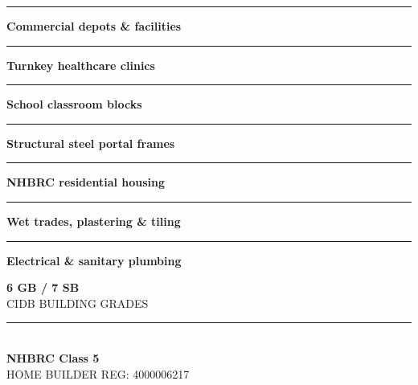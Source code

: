 \begin{minipage}[t]{0.34\textwidth}
    \vspace{0pt}
    \begin{tcolorbox}[
        enhanced, colback=mhoffwhite, colframe=mhnavy, boxrule=1pt, arc=4pt,
        title={\bfseries\color{white}\faBuilding\ Building Scope of Work},
        colbacktitle=mhnavy, left=7pt, right=7pt, top=6pt, bottom=6pt,
        drop shadow=black!6
    ]
        \fontsize{8.1pt}{11.6pt}\selectfont
        \textcolor{mhnavy}{\rule{4pt}{4pt}}\hspace{4pt}\textbf{Commercial depots \& facilities}\\
        \textcolor{mhnavy}{\rule{4pt}{4pt}}\hspace{4pt}\textbf{Turnkey healthcare clinics}\\
        \textcolor{mhnavy}{\rule{4pt}{4pt}}\hspace{4pt}\textbf{School classroom blocks}\\
        \textcolor{mhnavy}{\rule{4pt}{4pt}}\hspace{4pt}\textbf{Structural steel portal frames}\\
        \textcolor{mhnavy}{\rule{4pt}{4pt}}\hspace{4pt}\textbf{NHBRC residential housing}\\
        \textcolor{mhnavy}{\rule{4pt}{4pt}}\hspace{4pt}\textbf{Wet trades, plastering \& tiling}\\
        \textcolor{mhnavy}{\rule{4pt}{4pt}}\hspace{4pt}\textbf{Electrical \& sanitary plumbing}
    \end{tcolorbox}

    \vspace{0.20cm}

    \begin{tcolorbox}[
        enhanced, colback=white, colframe=mhlightgray, boxrule=0.8pt, arc=4pt,
        left=6pt, right=6pt, top=6pt, bottom=6pt, halign=center,
        drop shadow=black!4
    ]
        {\fontsize{18pt}{20pt}\selectfont\bfseries\color{mhblue}6 GB / 7 SB}\\[1pt]
        {\fontsize{7.4pt}{9pt}\selectfont\color{mhtextmuted}\MakeUppercase{CIDB Building Grades}}\\[4pt]
        \textcolor{mhlightgray}{\rule{3.2cm}{0.6pt}}\\[4pt]
        {\fontsize{13pt}{15pt}\selectfont\bfseries\color{mhnavy}NHBRC Class 5}\\[1pt]
        {\fontsize{7.2pt}{9pt}\selectfont\color{mhtextmuted}\MakeUppercase{Home Builder Reg: 4000006217}}
    \end{tcolorbox}
\end{minipage}

